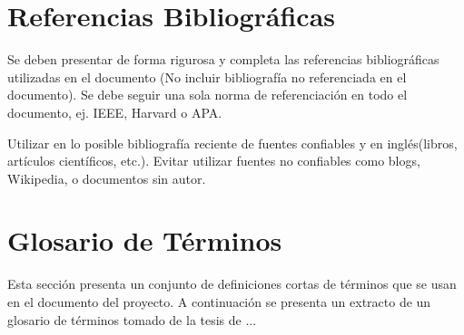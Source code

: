\documentclass[12pt]{article}
\begin{document}


\newpage

\newpage


\tableofcontents
\listoffigures
\listoftables
\newpage

 
\newpage

 
\newpage


\newpage


\newpage


\newpage


\newpage


\newpage


\newpage


\newpage


\newpage

\section{Referencias Bibliográficas}
Se deben presentar de forma rigurosa y completa las referencias bibliográficas utilizadas en el documento (No incluir bibliografía no referenciada en el documento). Se debe seguir una sola norma de referenciación en todo el documento, ej. IEEE, Harvard o APA.

Utilizar en lo posible bibliografía reciente de fuentes confiables y en inglés(libros, artículos científicos, etc.). Evitar utilizar fuentes no confiables como blogs, Wikipedia, o documentos sin autor.
%


\newpage

\section{Glosario de Términos}
Esta sección presenta un conjunto de definiciones cortas de términos que se usan en el documento del proyecto.  A continuación se presenta un extracto de un glosario de términos tomado de la tesis de ...
\end{document}
